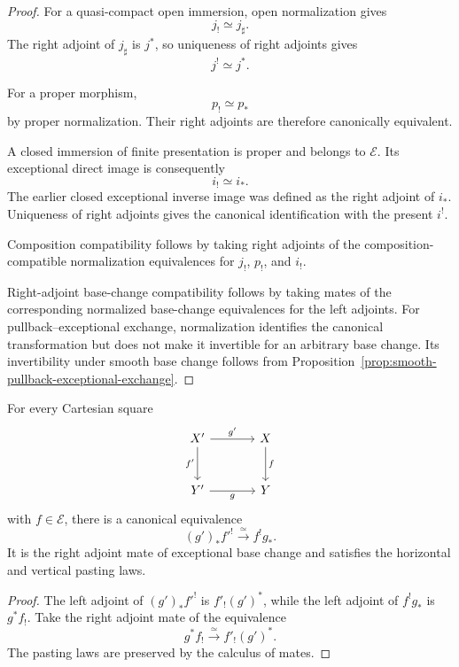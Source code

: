 \begin{proof}
For a quasi-compact open immersion, open normalization gives
\[
    j_!\simeq j_\sharp.
\]
The right adjoint of \(j_\sharp\) is \(j^*\), so uniqueness of right
adjoints gives
\[
    j^!\simeq j^*.
\]

For a proper morphism,
\[
    p_!\simeq p_*
\]
by proper normalization.  Their right adjoints are therefore canonically
equivalent.

A closed immersion of finite presentation is proper and belongs to
\(\mathcal E\).  Its exceptional direct image is consequently
\[
    i_!\simeq i_*.
\]
The earlier closed exceptional inverse image was defined as the right
adjoint of \(i_*\).  Uniqueness of right adjoints gives the canonical
identification with the present \(i^!\).

Composition compatibility follows by taking right adjoints of the
composition-compatible normalization equivalences for \(j_!\), \(p_!\),
and \(i_!\).

Right-adjoint base-change compatibility follows by taking mates of the
corresponding normalized base-change equivalences for the left adjoints.
For pullback--exceptional exchange, normalization identifies the canonical
transformation but does not make it invertible for an arbitrary base
change.  Its invertibility under smooth base change follows from
Proposition~\ref{prop:smooth-pullback-exceptional-exchange}.
\end{proof}

\begin{theorem}
\label{thm:right-adjoint-exceptional-base-change}
For every Cartesian square
\[
\begin{tikzcd}[column sep=large,row sep=large]
    X' \arrow[r,"g'"] \arrow[d,"f'"']
        & X \arrow[d,"f"] \\
    Y' \arrow[r,"g"']
        & Y
\end{tikzcd}
\]
with \(f\in\mathcal E\), there is a canonical equivalence
\[
    (g')_*f'^!
    \xrightarrow{\simeq}
    f^!g_*.
\]
It is the right adjoint mate of exceptional base change and satisfies the
horizontal and vertical pasting laws.
\end{theorem}

\begin{proof}
The left adjoint of \((g')_*f'^!\) is \(f'_!(g')^*\), while the left
adjoint of \(f^!g_*\) is \(g^*f_!\).  Take the right adjoint mate of the
equivalence
\[
    g^*f_!
    \xrightarrow{\simeq}
    f'_!(g')^*.
\]
The pasting laws are preserved by the calculus of mates.
\end{proof}


